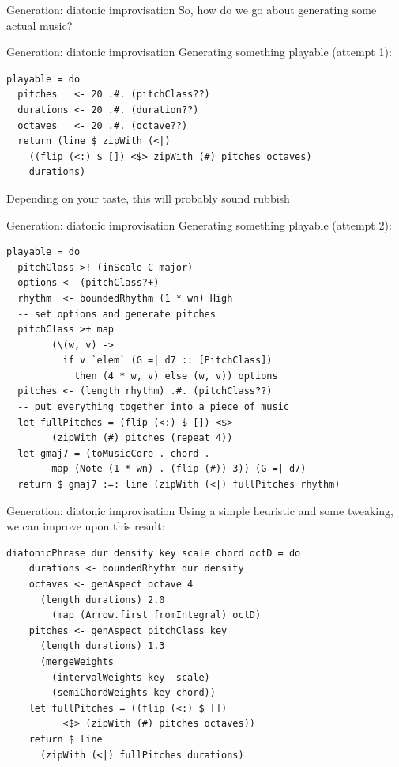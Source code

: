 \documentclass{beamer}
\begin{document}
    \begin{frame}[fragile=singleslide]{Generation: diatonic improvisation}
	So, how do we go about generating some actual music?
	\end{frame}

    \begin{frame}[fragile=singleslide]{Generation: diatonic improvisation}
	Generating something playable (attempt 1):

    \begin{verbatim}
playable = do
  pitches   <- 20 .#. (pitchClass??)
  durations <- 20 .#. (duration??)
  octaves   <- 20 .#. (octave??)
  return (line $ zipWith (<|)
    ((flip (<:) $ []) <$> zipWith (#) pitches octaves)
    durations)
    \end{verbatim}

    Depending on your taste, this will probably sound rubbish
	\end{frame}

    \begin{frame}[fragile=singleslide]{Generation: diatonic improvisation}
	Generating something playable (attempt 2):

    \begin{verbatim}
playable = do
  pitchClass >! (inScale C major)
  options <- (pitchClass?+)
  rhythm  <- boundedRhythm (1 * wn) High
  -- set options and generate pitches
  pitchClass >+ map
        (\(w, v) ->
          if v `elem` (G =| d7 :: [PitchClass])
            then (4 * w, v) else (w, v)) options
  pitches <- (length rhythm) .#. (pitchClass??)
  -- put everything together into a piece of music
  let fullPitches = (flip (<:) $ []) <$>
        (zipWith (#) pitches (repeat 4))
  let gmaj7 = (toMusicCore . chord .
        map (Note (1 * wn) . (flip (#)) 3)) (G =| d7)
  return $ gmaj7 :=: line (zipWith (<|) fullPitches rhythm)
    \end{verbatim}
	\end{frame}

    \begin{frame}[fragile=singleslide]{Generation: diatonic improvisation}
    Using a simple heuristic and some tweaking, we can improve upon this result:
    \begin{verbatim}
diatonicPhrase dur density key scale chord octD = do
    durations <- boundedRhythm dur density
    octaves <- genAspect octave 4
      (length durations) 2.0
        (map (Arrow.first fromIntegral) octD)
    pitches <- genAspect pitchClass key
      (length durations) 1.3
      (mergeWeights
        (intervalWeights key  scale)
        (semiChordWeights key chord))
    let fullPitches = ((flip (<:) $ [])
          <$> (zipWith (#) pitches octaves))
    return $ line
      (zipWith (<|) fullPitches durations)
    \end{verbatim}
	\end{frame}
\end{document}
